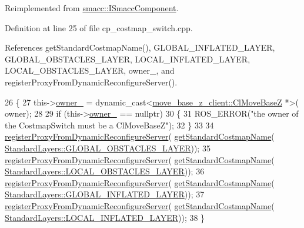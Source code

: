 Reimplemented from \hyperlink{classsmacc_1_1ISmaccComponent_a3378552cb1a86aa26a07c0edc057448b}{smacc\+::\+I\+Smacc\+Component}.



Definition at line 25 of file cp\+\_\+costmap\+\_\+switch.\+cpp.



References get\+Standard\+Costmap\+Name(), G\+L\+O\+B\+A\+L\+\_\+\+I\+N\+F\+L\+A\+T\+E\+D\+\_\+\+L\+A\+Y\+ER, G\+L\+O\+B\+A\+L\+\_\+\+O\+B\+S\+T\+A\+C\+L\+E\+S\+\_\+\+L\+A\+Y\+ER, L\+O\+C\+A\+L\+\_\+\+I\+N\+F\+L\+A\+T\+E\+D\+\_\+\+L\+A\+Y\+ER, L\+O\+C\+A\+L\+\_\+\+O\+B\+S\+T\+A\+C\+L\+E\+S\+\_\+\+L\+A\+Y\+ER, owner\+\_\+, and register\+Proxy\+From\+Dynamic\+Reconfigure\+Server().


\begin{DoxyCode}
26 \{
27     this->\hyperlink{classmove__base__z__client_1_1CostmapSwitch_a00517c28045327007d7b9335c9b433ed}{owner\_} = \textcolor{keyword}{dynamic\_cast<}\hyperlink{classmove__base__z__client_1_1ClMoveBaseZ}{move\_base\_z\_client::ClMoveBaseZ} *\textcolor{keyword}{>}(
      owner);
28 
29     \textcolor{keywordflow}{if} (this->\hyperlink{classmove__base__z__client_1_1CostmapSwitch_a00517c28045327007d7b9335c9b433ed}{owner\_} == \textcolor{keyword}{nullptr})
30     \{
31         ROS\_ERROR(\textcolor{stringliteral}{"the owner of the CostmapSwitch must be a ClMoveBaseZ"});
32     \}
33 
34     \hyperlink{classmove__base__z__client_1_1CostmapSwitch_a0282cb1651dd50803e3af0de1436635f}{registerProxyFromDynamicReconfigureServer}(
      \hyperlink{classmove__base__z__client_1_1CostmapSwitch_ae8635d58b81be774e18eb4afa99413e1}{getStandardCostmapName}(
      \hyperlink{classmove__base__z__client_1_1CostmapSwitch_a810338d2ba3fe25fc4ecf8c6c85b462ba94404229e09ab748aab0096bd5ff3656}{StandardLayers::GLOBAL\_OBSTACLES\_LAYER}));
35     \hyperlink{classmove__base__z__client_1_1CostmapSwitch_a0282cb1651dd50803e3af0de1436635f}{registerProxyFromDynamicReconfigureServer}(
      \hyperlink{classmove__base__z__client_1_1CostmapSwitch_ae8635d58b81be774e18eb4afa99413e1}{getStandardCostmapName}(
      \hyperlink{classmove__base__z__client_1_1CostmapSwitch_a810338d2ba3fe25fc4ecf8c6c85b462baff8d30cf6ceac8551691e28c328aebe6}{StandardLayers::LOCAL\_OBSTACLES\_LAYER}));
36     \hyperlink{classmove__base__z__client_1_1CostmapSwitch_a0282cb1651dd50803e3af0de1436635f}{registerProxyFromDynamicReconfigureServer}(
      \hyperlink{classmove__base__z__client_1_1CostmapSwitch_ae8635d58b81be774e18eb4afa99413e1}{getStandardCostmapName}(
      \hyperlink{classmove__base__z__client_1_1CostmapSwitch_a810338d2ba3fe25fc4ecf8c6c85b462ba1757575ee674622adfb325de182a65d6}{StandardLayers::GLOBAL\_INFLATED\_LAYER}));
37     \hyperlink{classmove__base__z__client_1_1CostmapSwitch_a0282cb1651dd50803e3af0de1436635f}{registerProxyFromDynamicReconfigureServer}(
      \hyperlink{classmove__base__z__client_1_1CostmapSwitch_ae8635d58b81be774e18eb4afa99413e1}{getStandardCostmapName}(
      \hyperlink{classmove__base__z__client_1_1CostmapSwitch_a810338d2ba3fe25fc4ecf8c6c85b462baab9e94e9dc4c62e74e48ee34b11c8807}{StandardLayers::LOCAL\_INFLATED\_LAYER}));
38 \}
\end{DoxyCode}


